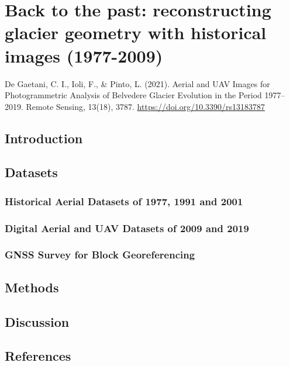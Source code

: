 \chapter{Back to the past: reconstructing glacier geometry with historical images (1977-2009)}

\vfill


\noindent De Gaetani, C. I., Ioli, F., & Pinto, L. (2021). Aerial and UAV Images for Photogrammetric Analysis of Belvedere Glacier Evolution in the Period 1977–2019. Remote Sensing, 13(18), 3787. \url{https://doi.org/10.3390/rs13183787}

\newpage

\section{Introduction}\label{sec:4:introduction}

\section{Datasets}\label{sec:4:datasets}

\subsection{Historical Aerial Datasets of 1977, 1991 and 2001}

\subsection{Digital Aerial and UAV Datasets of 2009 and 2019}

\subsection{GNSS Survey for Block Georeferencing}

\section{Methods}\label{sec:4:methods}

\section{Discussion}\label{sec:4:discussion}

\section{References}